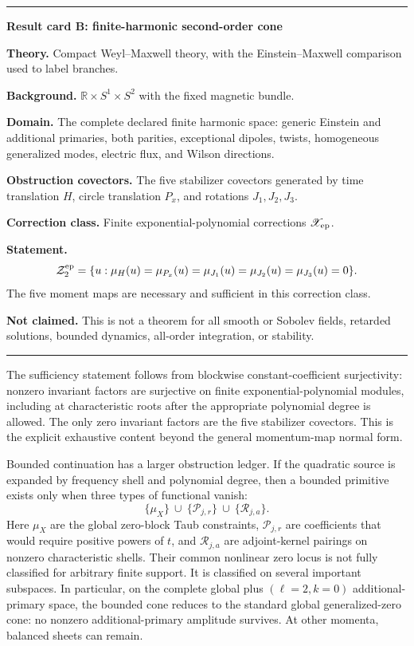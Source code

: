 \documentclass[11pt]{article}
\newcommand{\R}{\mathbb R}
\newenvironment{resultcard}[1]
 {\par\medskip\noindent\hrule\smallskip\noindent\textbf{#1}\par\smallskip}
 {\par\smallskip\hrule\medskip}
\begin{document}
\begin{resultcard}{Result card B: finite-harmonic second-order cone}
\textbf{Theory.} Compact Weyl--Maxwell theory, with the Einstein--Maxwell
comparison used to label branches.\par
\textbf{Background.} $\R\times S^1\times S^2$ with the fixed magnetic
bundle.\par
\textbf{Domain.} The complete declared finite harmonic space: generic
Einstein and additional primaries, both parities, exceptional dipoles,
twists, homogeneous generalized modes, electric flux, and Wilson directions.\par
\textbf{Obstruction covectors.} The five stabilizer covectors generated by time
translation $H$, circle translation $P_x$, and rotations $J_1,J_2,J_3$.\par
\textbf{Correction class.} Finite exponential-polynomial corrections
$\mathscr X_{\rm ep}$.\par
\textbf{Statement.}
\[
 \mathcal Z^{\rm ep}_2
 =\{u:\mu_H(u)=\mu_{P_x}(u)=
          \mu_{J_1}(u)=\mu_{J_2}(u)=\mu_{J_3}(u)=0\}.
\]
The five moment maps are necessary and sufficient in this correction class.\par
\textbf{Not claimed.} This is not a theorem for all smooth or Sobolev fields,
retarded solutions, bounded dynamics, all-order integration, or stability.
\end{resultcard}

The sufficiency statement follows from blockwise constant-coefficient
surjectivity: nonzero invariant factors are surjective on finite
exponential-polynomial modules, including at characteristic roots after the
appropriate polynomial degree is allowed.  The only zero invariant factors
are the five stabilizer covectors.  This is the explicit exhaustive content
beyond the general momentum-map normal form.

Bounded continuation has a larger obstruction ledger.  If the quadratic
source is expanded by frequency shell and polynomial degree, then a bounded
primitive exists only when three types of functional vanish:
\begin{equation}
 \{\mu_X\}
 \ \cup\ 
 \{\mathcal P_{j,r}\}
 \ \cup\ 
 \{\mathcal R_{j,a}\}.
 \label{eq:bounded-ledger}
\end{equation}
Here $\mu_X$ are the global zero-block Taub constraints,
$\mathcal P_{j,r}$ are coefficients that would require positive powers of
$t$, and $\mathcal R_{j,a}$ are adjoint-kernel pairings on nonzero
characteristic shells.  Their common nonlinear zero locus is not fully
classified for arbitrary finite support.  It is classified on several
important subspaces.  In particular, on the complete global plus
$(\ell=2,k=0)$ additional-primary space, the bounded cone reduces to the
standard global generalized-zero cone: no nonzero additional-primary
amplitude survives.  At other momenta, balanced sheets can remain.
\end{document}
